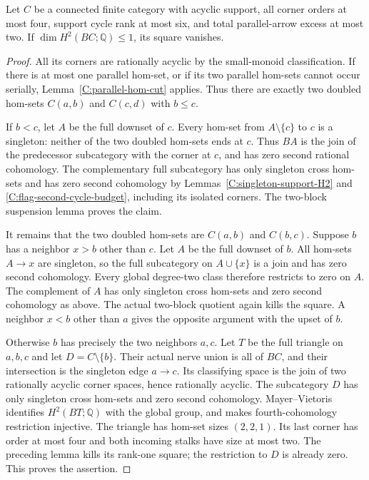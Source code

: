 \begin{lemma}
\label{C:two-parallel-small-corners}
Let $C$ be a connected finite category with acyclic support,
all corner orders at most four, support cycle rank at most
six, and total parallel-arrow excess at most two.
If $\dim H^2(BC;\mathbb Q)\leq1$, its square vanishes.
\end{lemma}
\begin{proof}
All its corners are rationally acyclic by the small-monoid
classification.  If there is at most one parallel hom-set,
or if its two parallel hom-sets cannot occur serially,
Lemma~\ref{C:parallel-hom-cut} applies.
Thus there are exactly two doubled hom-sets
$C(a,b)$ and $C(c,d)$ with $b\leq c$.

If $b<c$, let $A$ be the full downset of $c$.
Every hom-set from $A\setminus\{c\}$ to $c$ is a singleton:
neither of the two doubled hom-sets ends at $c$.
Thus $BA$ is the join of the predecessor subcategory with
the corner at $c$, and has zero second rational cohomology.
The complementary full subcategory has only singleton
cross hom-sets and has zero second cohomology by
Lemmas~\ref{C:singleton-support-H2} and
\ref{C:flag-second-cycle-budget}, including its isolated
corners.  The two-block suspension lemma proves the claim.

It remains that the two doubled hom-sets are
$C(a,b)$ and $C(b,c)$.  Suppose $b$ has a neighbor
$x>b$ other than $c$.  Let $A$ be the full downset of $b$.
All hom-sets $A\to x$ are singleton, so the full
subcategory on $A\cup\{x\}$ is a join and has zero
second cohomology.  Every global degree-two class
therefore restricts to zero on $A$.  The complement
of $A$ has only singleton cross hom-sets and zero
second cohomology as above.  The actual two-block
quotient again kills the square.  A neighbor $x<b$
other than $a$ gives the opposite argument with the
upset of $b$.

Otherwise $b$ has precisely the two neighbors $a,c$.
Let $T$ be the full triangle on $a,b,c$ and let
$D=C\setminus\{b\}$.  Their actual nerve union is all
of $BC$, and their intersection is the singleton edge
$a\to c$.  Its classifying space is the join of two
rationally acyclic corner spaces, hence rationally acyclic.
The subcategory $D$ has only singleton cross hom-sets and
zero second cohomology.  Mayer--Vietoris identifies
$H^2(BT;\mathbb Q)$ with the global group, and makes
fourth-cohomology restriction injective.
The triangle has hom-set sizes $(2,2,1)$.  Its last
corner has order at most four and both incoming stalks
have size at most two.  The preceding lemma kills its
rank-one square; the restriction to $D$ is already zero.
This proves the assertion.
\end{proof}

